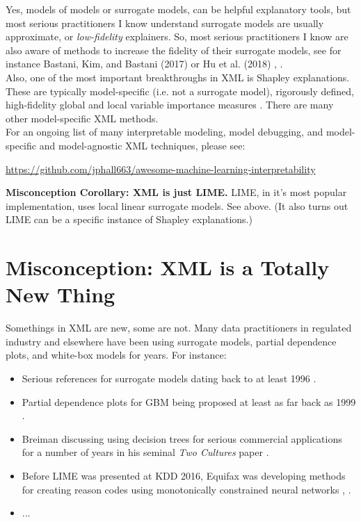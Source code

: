 \documentclass[fleqn]{article}
\begin{document}
Yes, models of models or surrogate models, can be helpful explanatory tools, but most serious practitioners  I know understand surrogate models are usually approximate, or \textit{low-fidelity} explainers. So, most serious practitioners I know are also aware of methods to increase the fidelity of their surrogate models, see for instance Bastani, Kim, and Bastani (2017) or Hu et al. (2018) \cite{dt_surrogate2}, \cite{lime-sup}.\\

Also, one of the most important breakthroughs in XML is Shapley explanations. These are typically model-specific (i.e. not a surrogate model), rigorously defined, high-fidelity global and local variable importance measures \cite{shapley}. There are many other model-specific XML methods. \\  

For an ongoing list of many interpretable modeling, model debugging, and model-specific and model-agnostic XML techniques, please see:
\begin{center}
\url{https://github.com/jphall663/awesome-machine-learning-interpretability}
\end{center}

\textbf{Misconception Corollary: XML is just LIME.} LIME, in it's most popular implementation, uses local linear surrogate models. See above. (It also turns out LIME can be a specific instance of Shapley explanations.)\\

\section{Misconception: XML is a Totally New Thing}

Somethings in XML are new, some are not. Many data practitioners in regulated industry and elsewhere have been using surrogate models, partial dependence plots, and white-box models for years. For instance:

\begin{itemize}
\item Serious references for surrogate models dating back to at least 1996 \cite{dt_surrogate1}.
\item Partial dependence plots for GBM being proposed at least as far back as 1999 \cite{greedyfunction}.
\item Breiman discussing using decision trees for serious commercial applications for a number of years in his seminal \textit{Two Cultures} paper \cite{two_cultures}.
\item Before LIME was presented at KDD 2016, Equifax was developing methods for creating reason codes using monotonically constrained neural networks \cite{lime}, \cite{hall2016evolution}.
\item ...
\end{itemize}
\end{document}
